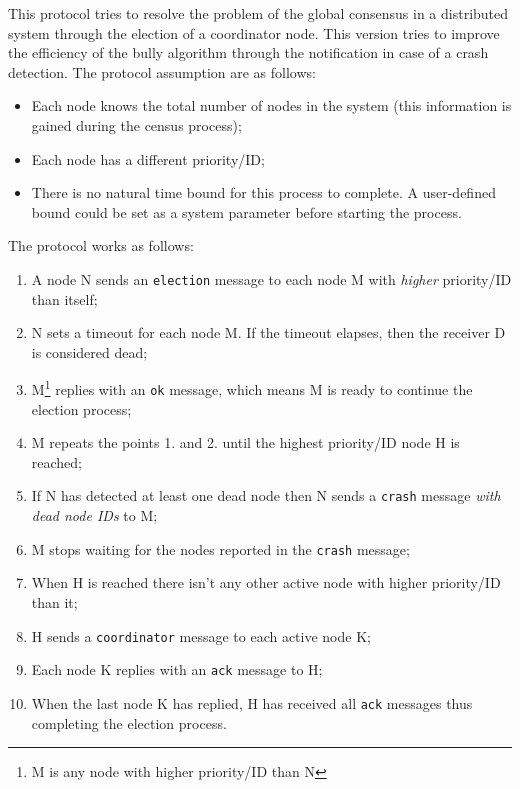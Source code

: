 This protocol tries to resolve the problem of the global consensus in a distributed system through the election
of a coordinator node. This version tries to improve the efficiency of the bully algorithm through the notification in case of a crash detection. The protocol assumption are as follows:

\begin{itemize}
\item Each node knows the total number of nodes in the system (this
  information is gained during the census process);
\item Each node has a different priority/ID;
\item There is no natural time bound for this process to complete. A
  user-defined bound could be set as a system parameter before starting the
  process.
\end{itemize}

The protocol works as follows:

\begin{enumerate}
\item A node N sends an \texttt{election} message to each node M with
  \textit{higher} priority/ID than itself;
\item N sets a timeout for each node M. If the timeout elapses, then the
  receiver D is considered dead; %
\item M\footnote{M is any node with higher priority/ID than N} replies with an
  \texttt{ok} message, which means M is ready to continue the election process;
\item M repeats the points 1. and 2. until the highest priority/ID node H is
  reached;
\item If N has detected at least one dead node then N sends a \texttt{crash}
  message \textit{with dead node IDs} to M;
\item M stops waiting for the nodes reported in the \texttt{crash} message;
\item When H is reached there isn't any other active node with higher
  priority/ID than it;
\item H sends a \texttt{coordinator} message to each active node K;
\item Each node K replies with an \texttt{ack} message to H;
\item When the last node K has replied, H has received all \texttt{ack}
  messages thus completing the election process.
\end{enumerate}

